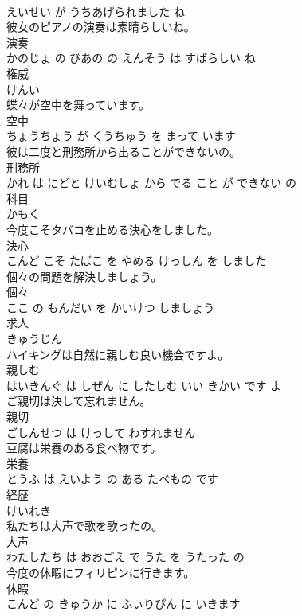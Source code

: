 \documentclass[8pt]{extreport}
\begin{document}
\begin{CJK}{UTF8}{min}
\\	えいせい が うちあげられました ね			
\\	彼女のピアノの演奏は素晴らしいね。	
\\	演奏 
\\	かのじょ の ぴあの の えんそう は すばらしい ね			
\\	権威	
\\	けんい		
\\	蝶々が空中を舞っています。	
\\	空中 
\\	ちょうちょう が くうちゅう を まって います			
\\	彼は二度と刑務所から出ることができないの。	
\\	刑務所 
\\	かれ は にどと けいむしょ から でる こと が できない の			
\\	科目	
\\	かもく		
\\	今度こそタバコを止める決心をしました。	
\\	決心 
\\	こんど こそ たばこ を やめる けっしん を しました			
\\	個々の問題を解決しましょう。	
\\	個々 
\\	ここ の もんだい を かいけつ しましょう			
\\	求人	
\\	きゅうじん		
\\	ハイキングは自然に親しむ良い機会ですよ。	
\\	親しむ 
\\	はいきんぐ は しぜん に したしむ いい きかい です よ			
\\	ご親切は決して忘れません。	
\\	親切 
\\	ごしんせつ は けっして わすれません			
\\	豆腐は栄養のある食べ物です。	
\\	栄養 
\\	とうふ は えいよう の ある たべもの です			
\\	経歴	
\\	けいれき		
\\	私たちは大声で歌を歌ったの。	
\\	大声 
\\	わたしたち は おおごえ で うた を うたった の			
\\	今度の休暇にフィリピンに行きます。	
\\	休暇 
\\	こんど の きゅうか に ふぃりぴん に いきます			

\end{CJK}
\end{document}
